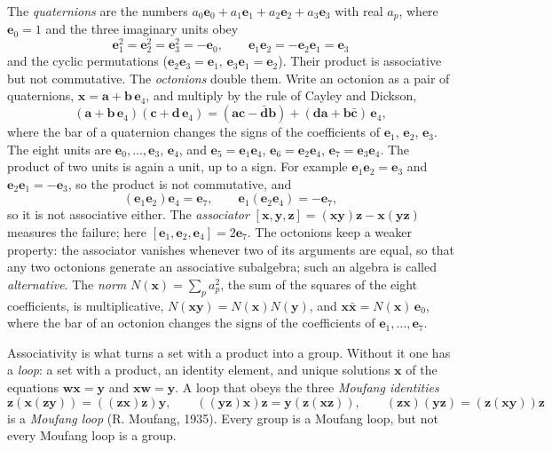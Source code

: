\documentclass[
  10pt,
]{article}
\begin{document}
The \emph{quaternions} are the numbers
\(a_0\mathbf e_0+a_1\mathbf e_1+a_2\mathbf e_2+a_3\mathbf e_3\) with
real \(a_p\), where \(\mathbf e_0=1\) and the three imaginary units obey
\[\mathbf e_1^2=\mathbf e_2^2=\mathbf e_3^2=-\mathbf e_0,\qquad\mathbf e_1\mathbf e_2=-\mathbf e_2\mathbf e_1=\mathbf e_3\tag{A.1}\]
and the cyclic permutations (\(\mathbf e_2\mathbf e_3=\mathbf e_1\),
\(\mathbf e_3\mathbf e_1=\mathbf e_2\)). Their product is associative
but not commutative. The \emph{octonions} double them. Write an octonion
as a pair of quaternions,
\(\mathbf x=\mathbf a+\mathbf b\,\mathbf e_4\), and multiply by the rule
of Cayley and Dickson,
\[(\mathbf a+\mathbf b\,\mathbf e_4)(\mathbf c+\mathbf d\,\mathbf e_4)=(\mathbf a\mathbf c-\bar{\mathbf d}\mathbf b)+(\mathbf d\mathbf a+\mathbf b\bar{\mathbf c})\,\mathbf e_4,\tag{A.2}\]
where the bar of a quaternion changes the signs of the coefficients of
\(\mathbf e_1\), \(\mathbf e_2\), \(\mathbf e_3\). The eight units are
\(\mathbf e_0,\dots,\mathbf e_3\), \(\mathbf e_4\), and
\(\mathbf e_5=\mathbf e_1\mathbf e_4\),
\(\mathbf e_6=\mathbf e_2\mathbf e_4\),
\(\mathbf e_7=\mathbf e_3\mathbf e_4\). The product of two units is
again a unit, up to a sign. For example
\(\mathbf e_1\mathbf e_2=\mathbf e_{3}\) and
\(\mathbf e_2\mathbf e_1=-\mathbf e_{3}\), so the product is not
commutative, and
\[(\mathbf e_1\mathbf e_2)\mathbf e_4=\mathbf e_{7},\qquad\mathbf e_1(\mathbf e_2\mathbf e_4)=-\mathbf e_{7},\tag{A.3}\]
so it is not associative either. The \emph{associator}
\([\mathbf x,\mathbf y,\mathbf z]=(\mathbf x\mathbf y)\mathbf z-\mathbf x(\mathbf y\mathbf z)\)
measures the failure; here
\([\mathbf e_1,\mathbf e_2,\mathbf e_4]=2\mathbf e_{7}\). The octonions
keep a weaker property: the associator vanishes whenever two of its
arguments are equal, so that any two octonions generate an associative
subalgebra; such an algebra is called \emph{alternative}. The
\emph{norm} \(N(\mathbf x)=\sum_pa_p^2\), the sum of the squares of the
eight coefficients, is multiplicative,
\(N(\mathbf x\mathbf y)=N(\mathbf x)N(\mathbf y)\), and
\(\mathbf x\bar{\mathbf x}=N(\mathbf x)\,\mathbf e_0\), where the bar of
an octonion changes the signs of the coefficients of
\(\mathbf e_1,\dots,\mathbf e_7\).

Associativity is what turns a set with a product into a group. Without
it one has a \emph{loop}: a set with a product, an identity element, and
unique solutions \(\mathbf x\) of the equations
\(\mathbf w\mathbf x=\mathbf y\) and \(\mathbf x\mathbf w=\mathbf y\). A
loop that obeys the three \emph{Moufang identities}
\[\mathbf z(\mathbf x(\mathbf z\mathbf y))=((\mathbf z\mathbf x)\mathbf z)\mathbf y,\qquad((\mathbf y\mathbf z)\mathbf x)\mathbf z=\mathbf y(\mathbf z(\mathbf x\mathbf z)),\qquad(\mathbf z\mathbf x)(\mathbf y\mathbf z)=(\mathbf z(\mathbf x\mathbf y))\mathbf z\tag{A.4}\]
is a \emph{Moufang loop} (R. Moufang, 1935). Every group is a Moufang
loop, but not every Moufang loop is a group.
\end{document}
